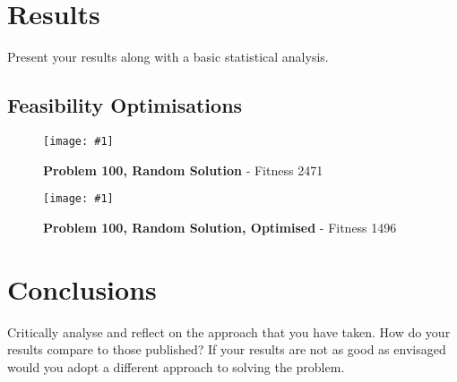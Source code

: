 \documentclass[14pt]{acmsiggraph}
\newcommand{\figuremacroW}[4]{
	\begin{figure}[h] %
		\centering
		\texttt{[image: \#1]}
		\caption[#2]{\textbf{#2} - #3}
		\label{fig:#1}
	\end{figure}
}
\begin{document}
	
	\section{Results}
	Present your results along with a basic statistical analysis.
	
	\subsection{Feasibility Optimisations}
	\figuremacroW
	{p100rnd}
	{Problem 100, Random Solution}
	{Fitness 2471}
	{1.0}
	\figuremacroW
	{p100rndopt}
	{Problem 100, Random Solution, Optimised}
	{Fitness 1496}
	{1.0}
	
	\section{Conclusions}
	Critically analyse and reflect on the approach that you have taken. How do your results compare to those published? If your results are not as good as envisaged would you adopt a different approach to solving the problem.
	
	
	
	
	
\end{document}
